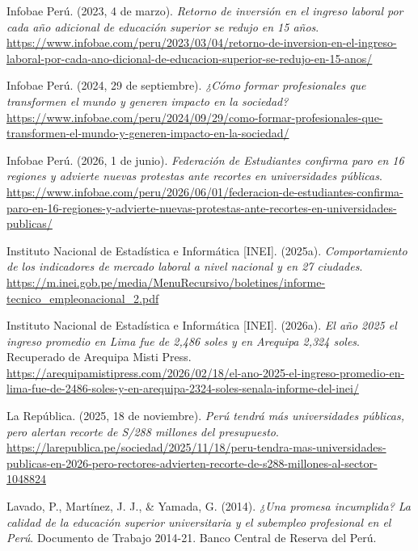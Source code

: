 \documentclass[11pt, a4paper]{article}
\begin{document}
\vspace{0.2cm}
\noindent\hangindent=1.27cm
Infobae Perú. (2023, 4 de marzo). \textit{Retorno de inversión en el ingreso laboral por cada año adicional de educación superior se redujo en 15 años}. \url{https://www.infobae.com/peru/2023/03/04/retorno-de-inversion-en-el-ingreso-laboral-por-cada-ano-dicional-de-educacion-superior-se-redujo-en-15-anos/}

\vspace{0.2cm}
\noindent\hangindent=1.27cm
Infobae Perú. (2024, 29 de septiembre). \textit{¿Cómo formar profesionales que transformen el mundo y generen impacto en la sociedad?} \url{https://www.infobae.com/peru/2024/09/29/como-formar-profesionales-que-transformen-el-mundo-y-generen-impacto-en-la-sociedad/}

\vspace{0.2cm}
\noindent\hangindent=1.27cm
Infobae Perú. (2026, 1 de junio). \textit{Federación de Estudiantes confirma paro en 16 regiones y advierte nuevas protestas ante recortes en universidades públicas}. \url{https://www.infobae.com/peru/2026/06/01/federacion-de-estudiantes-confirma-paro-en-16-regiones-y-advierte-nuevas-protestas-ante-recortes-en-universidades-publicas/}

\vspace{0.2cm}
\noindent\hangindent=1.27cm
Instituto Nacional de Estadística e Informática [INEI]. (2025a). \textit{Comportamiento de los indicadores de mercado laboral a nivel nacional y en 27 ciudades}. \url{https://m.inei.gob.pe/media/MenuRecursivo/boletines/informe-tecnico_empleonacional_2.pdf}

\vspace{0.2cm}
\noindent\hangindent=1.27cm
Instituto Nacional de Estadística e Informática [INEI]. (2026a). \textit{El año 2025 el ingreso promedio en Lima fue de 2,486 soles y en Arequipa 2,324 soles}. Recuperado de Arequipa Misti Press. \url{https://arequipamistipress.com/2026/02/18/el-ano-2025-el-ingreso-promedio-en-lima-fue-de-2486-soles-y-en-arequipa-2324-soles-senala-informe-del-inei/}

\vspace{0.2cm}
\noindent\hangindent=1.27cm
La República. (2025, 18 de noviembre). \textit{Perú tendrá más universidades públicas, pero alertan recorte de S/288 millones del presupuesto}. \url{https://larepublica.pe/sociedad/2025/11/18/peru-tendra-mas-universidades-publicas-en-2026-pero-rectores-advierten-recorte-de-s288-millones-al-sector-1048824}

\vspace{0.2cm}
\noindent\hangindent=1.27cm
Lavado, P., Martínez, J. J., \& Yamada, G. (2014). \textit{¿Una promesa incumplida? La calidad de la educación superior universitaria y el subempleo profesional en el Perú}. Documento de Trabajo 2014-21. Banco Central de Reserva del Perú.
\end{document}
